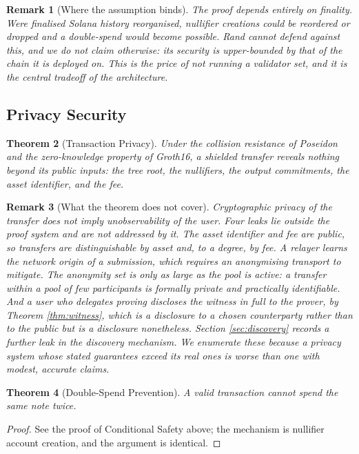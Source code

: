 \documentclass[11pt,a4paper]{article}
\newtheorem{theorem}{Theorem}[section]
\newtheorem{remark}[theorem]{Remark}
\begin{document}
\begin{remark}[Where the assumption binds]
The proof depends entirely on finality. Were finalised Solana history reorganised, nullifier creations could be reordered or dropped and a double-spend would become possible. Rand cannot defend against this, and we do not claim otherwise: its security is upper-bounded by that of the chain it is deployed on. This is the price of not running a validator set, and it is the central tradeoff of the architecture.
\end{remark}\subsection{Privacy Security}

\begin{theorem}[Transaction Privacy]
Under the collision resistance of Poseidon and the zero-knowledge property of Groth16, a shielded transfer reveals nothing beyond its public inputs: the tree root, the nullifiers, the output commitments, the asset identifier, and the fee.
\end{theorem}

\begin{remark}[What the theorem does not cover]
Cryptographic privacy of the transfer does not imply unobservability of the user. Four leaks lie outside the proof system and are not addressed by it. The asset identifier and fee are public, so transfers are distinguishable by asset and, to a degree, by fee. A relayer learns the network origin of a submission, which requires an anonymising transport to mitigate. The anonymity set is only as large as the pool is active: a transfer within a pool of few participants is formally private and practically identifiable. And a user who delegates proving discloses the witness in full to the prover, by Theorem \ref{thm:witness}, which is a disclosure to a chosen counterparty rather than to the public but is a disclosure nonetheless. Section \ref{sec:discovery} records a further leak in the discovery mechanism. We enumerate these because a privacy system whose stated guarantees exceed its real ones is worse than one with modest, accurate claims.
\end{remark}

\begin{theorem}[Double-Spend Prevention]
A valid transaction cannot spend the same note twice.
\end{theorem}

\begin{proof}
See the proof of Conditional Safety above; the mechanism is nullifier account creation, and the argument is identical.
\end{proof}
\end{document}

